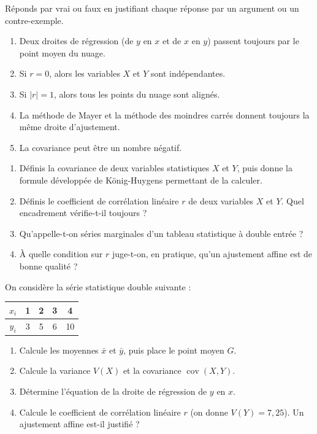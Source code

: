 \documentclass[11pt]{article}
\newcommand{\cle}[1]{{\popxbold\color{popdark}#1}}
\begin{document}
\begin{exercice}
Réponds par vrai ou faux en justifiant chaque réponse par un argument ou un contre-exemple.

\begin{enumerate}
\item Deux droites de régression (de $y$ en $x$ et de $x$ en $y$) passent toujours par le point moyen du nuage.
\item Si $r=0$, alors les variables $X$ et $Y$ sont indépendantes.
\item Si $|r|=1$, alors tous les points du nuage sont alignés.
\item La méthode de Mayer et la méthode des moindres carrés donnent toujours la même droite d'ajustement.
\item La covariance peut être un nombre négatif.
\end{enumerate}
\end{exercice}

\begin{exercice}
\begin{enumerate}
\item Définis la \cle{covariance} de deux variables statistiques $X$ et $Y$, puis donne la formule développée de König-Huygens permettant de la calculer.
\item Définis le \cle{coefficient de corrélation linéaire} $r$ de deux variables $X$ et $Y$. Quel encadrement vérifie-t-il toujours ?
\item Qu'appelle-t-on \cle{séries marginales} d'un tableau statistique à double entrée ?
\item À quelle condition sur $r$ juge-t-on, en pratique, qu'un ajustement affine est de bonne qualité ?
\end{enumerate}
\end{exercice}

\begin{exercice}
On considère la série statistique double suivante :

\begin{center}
\begin{tabular}{|c|cccc|}
\hline
\rowcolor{popblueL} $x_i$ & 1 & 2 & 3 & 4 \\
\hline
$y_i$ & 3 & 5 & 6 & 10 \\
\hline
\end{tabular}
\end{center}

\begin{enumerate}
\item Calcule les moyennes $\bar{x}$ et $\bar{y}$, puis place le point moyen $G$.
\item Calcule la variance $V(X)$ et la covariance $\operatorname{cov}(X,Y)$.
\item Détermine l'équation de la droite de régression de $y$ en $x$.
\item Calcule le coefficient de corrélation linéaire $r$ (on donne $V(Y)=7{,}25$). Un ajustement affine est-il justifié ?
\end{enumerate}
\end{exercice}
\end{document}
